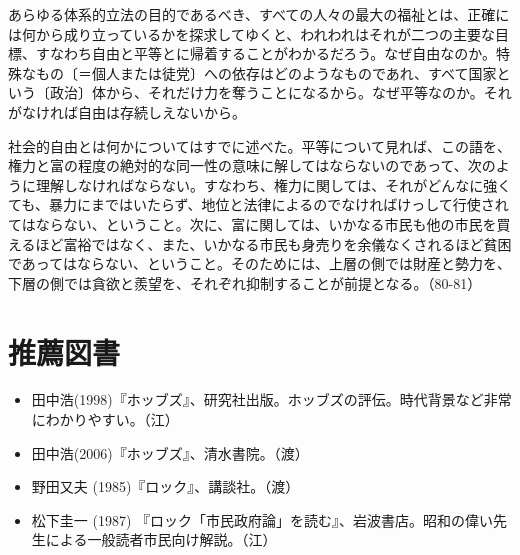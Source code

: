 あらゆる体系的立法の目的であるべき、すべての人々の最大の福祉とは、正確には何から成り立っているかを探求してゆくと、われわれはそれが二つの主要な目標、すなわち自由と平等とに帰着することがわかるだろう。なぜ自由なのか。特殊なもの〔＝個人または徒党〕への依存はどのようなものであれ、すべて国家という〔政治〕体から、それだけ力を奪うことになるから。なぜ平等なのか。それがなければ自由は存続しえないから。

社会的自由とは何かについてはすでに述べた。平等について見れば、この語を、権力と富の程度の絶対的な同一性の意味に解してはならないのであって、次のように理解しなければならない。すなわち、権力に関しては、それがどんなに強くても、暴力にまではいたらず、地位と法律によるのでなければけっして行使されてはならない、ということ。次に、富に関しては、いかなる市民も他の市民を買えるほど富裕ではなく、また、いかなる市民も身売りを余儀なくされるほど貧困であってはならない、ということ。そのためには、上層の側では財産と勢力を、下層の側では貪欲と羨望を、それぞれ抑制することが前提となる。（80-81）


\vspace{2zw}

\section{推薦図書}



\begin{itemize}
\item 田中浩(1998)『ホッブズ』、研究社出版。ホッブズの評伝。時代背景など非常にわかりやすい。（江）
\item 田中浩(2006)『ホッブズ』、清水書院。（渡）
\item 野田又夫 (1985)『ロック』、講談社。（渡）
\item 松下圭一 (1987) 『ロック「市民政府論」を読む』、岩波書店。昭和の偉い先生による一般読者市民向け解説。（江）
\end{itemize}





